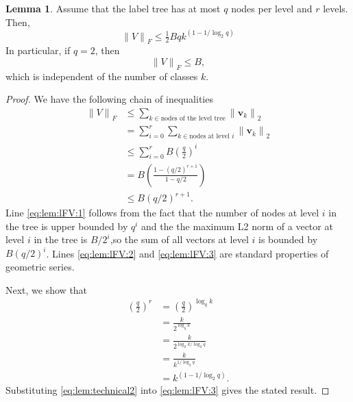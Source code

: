 \documentclass[twoside]{article}
\theoremstyle{definition}
\newtheorem{lemma}{Lemma}
\newcommand{\vv}{\mathbf v}
\newcommand{\ltwo}[1]{{\lVert {#1} \rVert}_2}
\newcommand{\lF}[1]{{\lVert {#1} \rVert}_F}
\begin{document}
\begin{lemma}
    Assume that the label tree has at most $q$ nodes per level and $r$ levels.
    Then,
    \begin{equation}
        \lF{V} \le \tfrac12 Bq k^{(1 - 1/\log_2 q)}
    \end{equation}
    In particular, if $q=2$, then
    \begin{equation}
        \lF{V} \le B,
    \end{equation}
    which is independent of the number of classes $k$.
\end{lemma}
\begin{proof}
    We have the following chain of inequalities
    \begin{align}
        \lF{V} 
        &\le \sum_{k\in \text{nodes of the level tree}} \ltwo{\vv_k}
        \\
        &= \sum_{i=0}^r \sum_{k\in \text{nodes at level $i$}} \ltwo{\vv_k}
        \\
        &\le \sum_{i=0}^r B\left(\frac {q} {2}\right)^i
        \label{eq:lem:lFV:1}
        \\
        &=
        B\left(\frac{1 - (q/2)^{r+1}}{1-q/2}\right)
        \label{eq:lem:lFV:2}
        \\
        &\le
        B(q/2)^{r+1}.
        \label{eq:lem:lFV:3}
    \end{align}
    Line \eqref{eq:lem:lFV:1} follows from the fact that the number of nodes at level $i$ in the tree is upper bounded by $q^i$ and the the maximum L2 norm of a vector at level $i$ in the tree is $B/2^i$,so the sum of all vectors at level $i$ is bounded by $B(q/2)^i$.
    Lines \eqref{eq:lem:lFV:2} and \eqref{eq:lem:lFV:3} are standard properties of geometric series.

    Next, we show that
    \begin{equation}
    \begin{split}
        \left(\frac q 2\right)^r
        &=
        \left(\frac q 2\right)^{\log_q k}\\
        &=
        \frac{k}{2^{\log_q k}}\\
        &=
        \frac{k}{2^{{\log_2 k}/{\log_2 q}}}\\
        &=
        \frac{k}{k^{1/\log_2 q}}\\
        &=
        k^{\left(1 - {1}/{\log_2 q}\right)}
        .
        \label{eq:lem:technical2}
    \end{split}
    \end{equation}
    Substituting \eqref{eq:lem:technical2} into \eqref{eq:lem:lFV:3} gives the stated result.
\end{proof}
\end{document}
